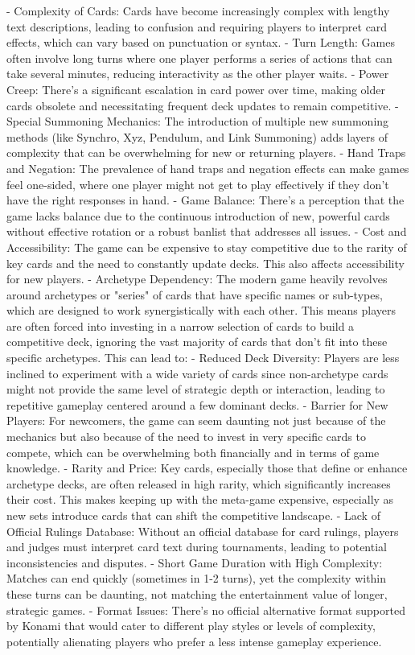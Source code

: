 - Complexity of Cards: Cards have become increasingly complex with lengthy text descriptions, leading to confusion and requiring players to interpret card effects, which can vary based on punctuation or syntax.
- Turn Length: Games often involve long turns where one player performs a series of actions that can take several minutes, reducing interactivity as the other player waits.
- Power Creep: There's a significant escalation in card power over time, making older cards obsolete and necessitating frequent deck updates to remain competitive.
- Special Summoning Mechanics: The introduction of multiple new summoning methods (like Synchro, Xyz, Pendulum, and Link Summoning) adds layers of complexity that can be overwhelming for new or returning players.
- Hand Traps and Negation: The prevalence of hand traps and negation effects can make games feel one-sided, where one player might not get to play effectively if they don't have the right responses in hand.
- Game Balance: There's a perception that the game lacks balance due to the continuous introduction of new, powerful cards without effective rotation or a robust banlist that addresses all issues.
- Cost and Accessibility: The game can be expensive to stay competitive due to the rarity of key cards and the need to constantly update decks. This also affects accessibility for new players. 
- Archetype Dependency: The modern game heavily revolves around archetypes or "series" of cards that have specific names or sub-types, which are designed to work synergistically with each other. This means players are often forced into investing in a narrow selection of cards to build a competitive deck, ignoring the vast majority of cards that don't fit into these specific archetypes. This can lead to:
  - Reduced Deck Diversity: Players are less inclined to experiment with a wide variety of cards since non-archetype cards might not provide the same level of strategic depth or interaction, leading to repetitive gameplay centered around a few dominant decks.
  - Barrier for New Players: For newcomers, the game can seem daunting not just because of the mechanics but also because of the need to invest in very specific cards to compete, which can be overwhelming both financially and in terms of game knowledge.
- Rarity and Price: Key cards, especially those that define or enhance archetype decks, are often released in high rarity, which significantly increases their cost. This makes keeping up with the meta-game expensive, especially as new sets introduce cards that can shift the competitive landscape.
- Lack of Official Rulings Database: Without an official database for card rulings, players and judges must interpret card text during tournaments, leading to potential inconsistencies and disputes.
- Short Game Duration with High Complexity: Matches can end quickly (sometimes in 1-2 turns), yet the complexity within these turns can be daunting, not matching the entertainment value of longer, strategic games.
- Format Issues: There's no official alternative format supported by Konami that would cater to different play styles or levels of complexity, potentially alienating players who prefer a less intense gameplay experience.


